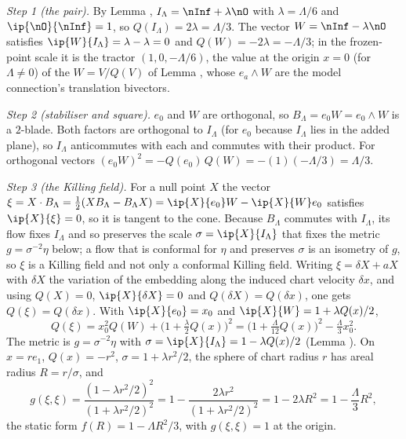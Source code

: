 \emph{Step 1 (the pair).} By Lemma , $I_{\Lambda} = \nInf + \lambda\nO$ with $\lambda = \Lambda/6$ and $\ip{\nO}{\nInf} = 1$, so $Q(I_{\Lambda}) = 2\lambda = \Lambda/3$. The vector $W = \nInf - \lambda\nO$ satisfies $\ip{W}{I_{\Lambda}} = \lambda - \lambda = 0$ and $Q(W) = -2\lambda = -\Lambda/3$; in the frozen-point scale it is the tractor $(1, 0, -\Lambda/6)$, the value at the origin $x=0$ (for $\Lambda\neq0$) of the $W = V/Q(V)$ of Lemma , whose $e_{a}\wedge W$ are the model connection's translation bivectors.

\emph{Step 2 (stabiliser and square).} $e_{0}$ and $W$ are orthogonal, so $B_{\Lambda} = e_{0}W = e_{0}\wedge W$ is a $2$-blade. Both factors are orthogonal to $I_{\Lambda}$ (for $e_{0}$ because $I_{\Lambda}$ lies in the added plane), so $I_{\Lambda}$ anticommutes with each and commutes with their product. For orthogonal vectors $(e_{0}W)^{2} = -Q(e_{0})\,Q(W) = -(1)(-\Lambda/3) = \Lambda/3$.

\emph{Step 3 (the Killing field).} For a null point $X$ the vector $\xi = X\cdot B_{\Lambda} = \tfrac12(XB_{\Lambda} - B_{\Lambda}X) = \ip{X}{e_{0}}W - \ip{X}{W}e_{0}$ satisfies $\ip{X}{\xi} = 0$, so it is tangent to the cone. Because $B_{\Lambda}$ commutes with $I_{\Lambda}$, its flow fixes $I_{\Lambda}$ and so preserves the scale $\sigma = \ip{X}{I_{\Lambda}}$ that fixes the metric $g = \sigma^{-2}\eta$ below; a flow that is conformal for $\eta$ and preserves $\sigma$ is an isometry of $g$, so $\xi$ is a Killing field and not only a conformal Killing field. Writing $\xi = \delta X + aX$ with $\delta X$ the variation of the embedding along the induced chart velocity $\delta x$, and using $Q(X) = 0$, $\ip{X}{\delta X} = 0$ and $Q(\delta X) = Q(\delta x)$, one gets $Q(\xi) = Q(\delta x)$. With $\ip{X}{e_{0}} = x_{0}$ and $\ip{X}{W} = 1 + \lambda Q(x)/2$,
\[
Q(\xi) = x_{0}^{2}Q(W) + \bigl(1 + \tfrac{\lambda}{2}Q(x)\bigr)^{2} = \bigl(1 + \tfrac{\Lambda}{12}Q(x)\bigr)^{2} - \tfrac{\Lambda}{3}x_{0}^{2} .
\]
The metric is $g = \sigma^{-2}\eta$ with $\sigma = \ip{X}{I_{\Lambda}} = 1 - \lambda Q(x)/2$ (Lemma ). On $x = re_{1}$, $Q(x) = -r^{2}$, $\sigma = 1 + \lambda r^{2}/2$, the sphere of chart radius $r$ has areal radius $R = r/\sigma$, and
\[
g(\xi,\xi) = \frac{(1 - \lambda r^{2}/2)^{2}}{(1 + \lambda r^{2}/2)^{2}} = 1 - \frac{2\lambda r^{2}}{(1 + \lambda r^{2}/2)^{2}} = 1 - 2\lambda R^{2} = 1 - \frac{\Lambda}{3}R^{2},
\]
the static form $f(R) = 1 - \Lambda R^{2}/3$, with $g(\xi,\xi) = 1$ at the origin.

